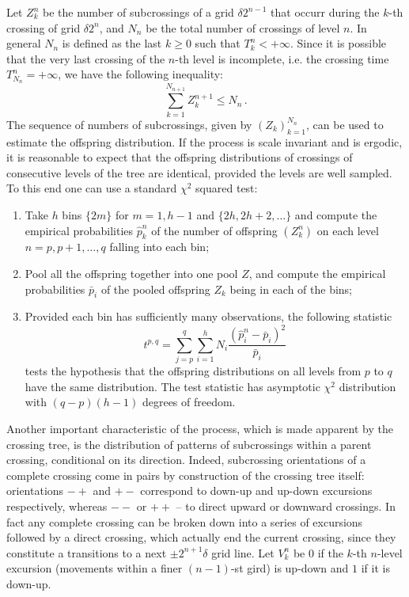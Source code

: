 \documentclass[a4paper]{article}
\begin{document}
Let $Z_k^n$ be the number of subcrossings of a grid $\delta 2^{n-1}$ that occurr
during the $k$-th crossing of grid $\delta 2^n$, and $N_n$ be the total number
of crossings of level $n$. In general $N_n$ is defined as the last $k\geq0$ such that
$T_k^n < +\infty$. Since it is possible that the very last crossing of the $n$-th
level is incomplete, i.e. the crossing time $T_{N_n}^n = +\infty$, we have the following
inequality:
\[ \sum_{k=1}^{N_{n+1}} Z_k^{n+1} \leq N_n \,.\]
The sequence of numbers of subcrossings, given by $(Z_k)_{k=1}^{N_n}$, can be used to
estimate the offspring distribution. If the process is scale invariant and is ergodic,
it is reasonable to expect that the offspring distributions of crossings of consecutive
levels of the tree are identical, provided the levels are well sampled. To this end one
can use a standard $\chi^2$ squared test:
\begin{enumerate}
    \item Take $h$ bins $\{2m\}$ for $m = 1,h-1$ and $\{2h, 2h+2,\ldots\}$ and compute
    the empirical probabilities $\hat{p}_k^n$ of the number of offspring $(Z_k^n)$ on
    each level $n=p, p+1, \ldots, q$ falling into each bin;
    \item Pool all the offspring together into one pool $Z$, and compute the empirical
    probabilities $\bar{p}_i$ of the pooled offspring $Z_k$ being in each of the bins;
    \item Provided each bin has sufficiently many observations, the following statistic
    \[ t^{p,q} = \sum_{j=p}^q \sum_{i=1}^h N_i \frac{(\hat{p}_i^n-\bar{p}_i)^2}{\bar{p}_i} \]
    tests the hypothesis that the offspring distributions on all levels from $p$ to $q$
    have the same distribution. The test statistic has asymptotic $\chi^2$ distribution
    with $(q-p)(h-1)$ degrees of freedom.
\end{enumerate}

Another important characteristic of the process, which is made apparent by the crossing
tree, is the distribution of patterns of subcrossings within a parent crossing, conditional
on its direction. Indeed, subcrossing orientations of a complete crossing come in
pairs by construction of the crossing tree itself: orientations $-+$ and $+-$ correspond
to down-up and up-down excursions respectively, whereas $--$ or $++$ -- to direct
upward or downward crossings. In fact any complete crossing can be broken down
into a series of excursions followed by a direct crossing, which actually end the
current crossing, since they constitute a transitions to a next $\pm2^{n+1} \delta$
grid line. Let $V_k^n$ be $0$ if the $k$-th $n$-level excursion (movements within a finer
$(n-1)$-st gird) is up-down and $1$ if it is down-up.
\end{document}
